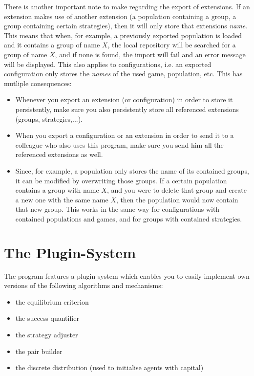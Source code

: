 \documentclass[parskip=full,11pt]{scrartcl}
\begin{document}
There is another important note to make regarding the export of extensions. If an extension makes use of another extension (a population containing a group, a group containing certain strategies), then it will only store that extensions \textit{name}. This means that when, for example, a previously exported population is loaded and it contains a group of name \(X\), the local repository will be searched for a group of name \(X\), and if none is found, the import will fail and an error message will be displayed. This also applies to configurations, i.e. an exported configuration only stores the \textit{names} of the used game, population, etc. This has mutliple consequences:
\begin{itemize}
\item Whenever you export an extension (or configuration) in order to store it persistently, make sure you also persistently store all referenced extensions (groups, strategies,...).
\item When you export a configuration or an extension in order to send it to a colleague who also uses this program, make sure you send him all the referenced extensions as well.
\item Since, for example, a population only stores the name of its contained groups, it can be modified by overwriting those groups. If a certain population contains a group with name \(X\), and you were to delete that group and create a new one with the same name \(X\), then the population would now contain that new group. This works in the same way for configurations with contained populations and games, and for groups with contained strategies.
\end{itemize}

\section{The Plugin-System}

The program features a plugin system which enables you to easily implement own versions of the following algorithms and mechanisms:

\begin{itemize} \itemsep -10pt
	\item the equilibrium criterion
	\item the success quantifier
	\item the strategy adjuster
	\item the pair builder
	\item the discrete distribution (used to initialise agents with capital)
\end{itemize}
\end{document}
